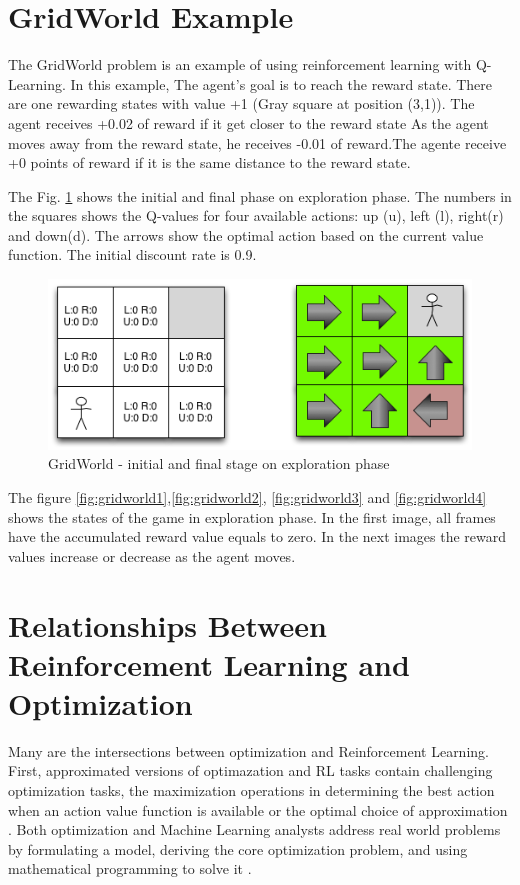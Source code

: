 \section{GridWorld Example}

The GridWorld problem is an example of using reinforcement learning with Q-Learning. In this example,  The agent's goal is to reach the reward state.  There are one rewarding states with value +1 (Gray square at position (3,1)). The agent receives +0.02 of reward if it get closer to the reward state  As the agent moves away from the reward state, he receives -0.01 of reward.The agente receive +0 points of reward if it is the same distance to the reward state.

The Fig. \ref{fig:gridworld} shows the initial and final phase on exploration phase. The numbers in the squares shows the Q-values  for four available actions: up (u), left (l), right(r) and down(d). The arrows show the optimal action based on the current value function. The initial discount rate is 0.9. 

\begin{figure}[h!]
\centering
\includegraphics[width=1\textwidth]{./images/mdpgridworld.png}
\caption{GridWorld - initial and final stage on exploration phase}
\label{fig:gridworld}
\end{figure}

The figure  \ref{fig:gridworld1},\ref{fig:gridworld2}, \ref{fig:gridworld3} and \ref{fig:gridworld4}   shows the states of the game in exploration phase. In the first image, all frames have the accumulated reward value equals to zero. In the next images the reward values increase or decrease as the agent moves.

\section{Relationships Between Reinforcement Learning and Optimization}

Many are the intersections between optimization and Reinforcement Learning. First, approximated versions of optimazation and RL tasks contain challenging optimization tasks,  the maximization operations in determining the best action when an action value function is available or the optimal choice of approximation \cite{Battiti2009}. Both optimization and Machine Learning analysts address real world problems by formulating a model, deriving the core optimization problem, and using mathematical programming to solve it \cite{Bennett2006} \cite{Boyan2000}. 

